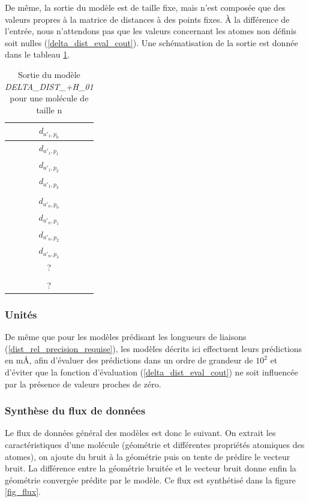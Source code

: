 \par De même, la sortie du modèle est de taille fixe, mais n'est composée que des valeurs propres à la matrice de distances à des points fixes. À la différence de l'entrée, nous n'attendons pas que les valeurs concernant les atomes non définis soit nulles (\ref{delta_dist_eval_cout}). Une schématisation de la sortie est donnée dans le tableau \ref{t_sortie_delta_dist}.

\begin{table}
	\centering
	
	\begin{tabular}{|c|}
		\hline
		$d_{a'_1,p_0}$ \\ \hline
		$d_{a'_1,p_1}$ \\ \hline
		$d_{a'_1,p_2}$ \\ \hline
		$d_{a'_1,p_3}$ \\ \hline
		\rot{... } \\ \hline
		$d_{a'_n,p_0}$ \\ \hline
		$d_{a'_n,p_1}$ \\ \hline
		$d_{a'_n,p_2}$ \\ \hline
		$d_{a'_n,p_3}$ \\ \hline
		? \\ \hline
		\rot{... } \\ \hline
		? \\ \hline		
	\end{tabular}

	\caption{Sortie du modèle \emph{DELTA\_DIST\_+H\_01} pour une molécule de taille n}
	\label{t_sortie_delta_dist}
\end{table}

\subsubsection{Unités}
\par De même que pour les modèles prédisant les longueurs de liaisons (\ref{dist_rel_precision_requise}), les modèles décrits ici effectuent leurs prédictions en mÅ, afin d'évaluer des prédictions dans un ordre de grandeur de $10^2$ et d'éviter que la fonction d'évaluation (\ref{delta_dist_eval_cout}) ne soit influencée par la présence de valeurs proches de zéro.

\subsubsection{Synthèse du flux de données}

\label{delta_dist_entree_sortie}
\par Le flux de données général des modèles est donc le suivant. On extrait les caractéristiques d'une molécule (géométrie et différentes propriétés atomiques des atomes), on ajoute du bruit à la géométrie puis on tente de prédire le vecteur bruit. La différence entre la géométrie bruitée et le vecteur bruit donne enfin la géométrie convergée prédite par le modèle. Ce flux est synthétisé dans la figure \ref{fig_flux}.

